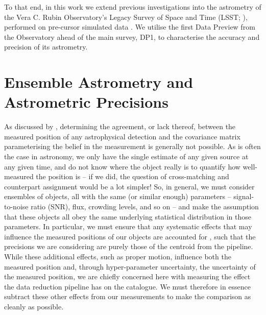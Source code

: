 \documentclass[SE,lsstdraft,authoryear,toc]{lsstdoc}
\begin{document}
To that end, in this work we extend previous investigations into the astrometry of the Vera C. Rubin Observatory's Legacy Survey of Space and Time (LSST; \citealp{Ivezic2019}), performed on pre-cursor simulated data \citep{sitcomtn-159}.
We utilise the first Data Preview from the Observatory ahead of the main survey, DP1, to characterise the accuracy and precision of its astrometry.

\section{Ensemble Astrometry and Astrometric Precisions}
As discussed by \citet{sitcomtn-159}, determining the agreement, or lack thereof, between the measured position of any astrophysical detection and the covariance matrix parameterising the belief in the measurement is generally not possible.
As is often the case in astronomy, we only have the single estimate of any given source at any given time, and do not know where the object really is to quantify how well-measured the position is -- if we did, the question of cross-matching and counterpart assignment would be a lot simpler!
So, in general, we must consider ensembles of objects, all with the same (or similar enough) parameters -- signal-to-noise ratio (SNR), flux, crowding levels, and so on -- and make the assumption that these objects all obey the same underlying statistical distribution in those parameters.
In particular, we must ensure that any systematic effects that may influence the measured positions of our objects are accounted for \citep[e.g.,][]{2017MNRAS.468.2517W,2018MNRAS.481.2148W,Wilson2023}, such that the precisions we are considering are purely those of the centroid from the pipeline.
While these additional effects, such as proper motion, influence both the measured position and, through hyper-parameter uncertainty, the uncertainty of the measured position, we are chiefly concerned here with measuring the effect the data reduction pipeline has on the catalogue.
We must therefore in essence subtract these other effects from our measurements to make the comparison as cleanly as possible.
\end{document}
